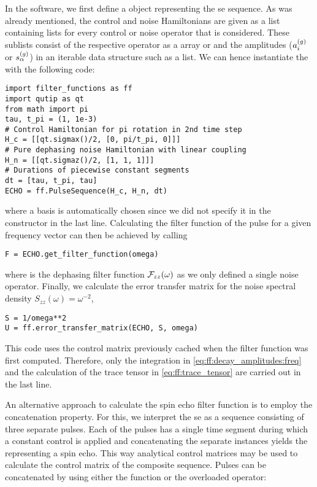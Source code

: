In the software, we first define a \pulsesequence object representing the \gls{se} sequence.
As was already mentioned, the control and noise Hamiltonians are given as a list containing lists for every control or noise operator that is considered.
These sublists consist of the respective operator as a \numpy array or \qutip \qobj and the amplitudes ($a_i^{(g)}$ or $s_\alpha^{(g)}$) in an iterable data structure such as a list.
We can hence instantiate the \pulsesequence with the following code:

\begin{verbatim}
import filter_functions as ff
import qutip as qt
from math import pi
tau, t_pi = (1, 1e-3)
# Control Hamiltonian for pi rotation in 2nd time step
H_c = [[qt.sigmax()/2, [0, pi/t_pi, 0]]]
# Pure dephasing noise Hamiltonian with linear coupling
H_n = [[qt.sigmaz()/2, [1, 1, 1]]]
# Durations of piecewise constant segments
dt = [tau, t_pi, tau]
ECHO = ff.PulseSequence(H_c, H_n, dt)
\end{verbatim}

where a basis is automatically chosen since we did not specify it in the constructor in the last line.
Calculating the filter function of the pulse for a given frequency vector  can then be achieved by calling

\begin{verbatim}
F = ECHO.get_filter_function(omega)
\end{verbatim}

where  is the dephasing filter function $\mathcal{F}_{zz}(\omega)$ as we only defined a single noise operator.
Finally, we calculate the error transfer matrix \liouvUe for the noise spectral density $S_{zz}(\omega) = \omega^{-2}$,

\begin{verbatim}
S = 1/omega**2
U = ff.error_transfer_matrix(ECHO, S, omega)
\end{verbatim}

This code uses the control matrix previously cached when the filter function was first computed.
Therefore, only the integration in \cref{eq:ff:decay_amplitudes:freq} and the calculation of the trace tensor in \cref{eq:ff:trace_tensor} are carried out in the last line.

An alternative approach to calculate the spin echo filter function is to employ the concatenation property.
For this, we interpret the \gls{se} as a sequence consisting of three separate pulses.
Each of the pulses has a single time segment during which a constant control is applied and concatenating the separate \pulsesequence instances yields the \pulsesequence representing a spin echo.
This way analytical control matrices may be used to calculate the control matrix of the composite sequence.
Pulses can be concatenated by using either the  function or the overloaded  operator:

